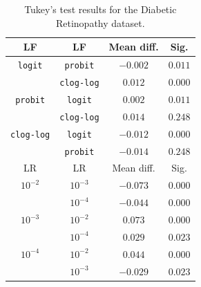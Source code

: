 \documentclass[journal]{IEEEtran}
\begin{document}
	\begin{table}[!t]
		\caption{Tukey's test results for the Diabetic Retinopathy dataset.}
		\label{table:TukeyDR}
		\centering
		\begin{tabular}{cccc}
			\hline\hline
			       LF         &        LF         & Mean diff. &  Sig.   \\ \hline
			 \texttt{logit}   &  \texttt{probit}  &  $-0.002$  & $0.011$ \\
			                  & \texttt{clog-log} &  $0.012$   & $0.000$ \\
			 \texttt{probit}  &  \texttt{logit}   &  $0.002$   & $0.011$ \\
			                  & \texttt{clog-log} &  $0.014$   & $0.248$ \\
			\texttt{clog-log} &  \texttt{logit}   &  $-0.012$  & $0.000$ \\
			                  &  \texttt{probit}  &  $-0.014$  & $0.248$ \\ \hline\hline
			       LR         &        LR         & Mean diff. &  Sig.   \\ \hline
			    $10^{-2}$     &     $10^{-3}$     &  $-0.073$  & $0.000$ \\
			                  &     $10^{-4}$     &  $-0.044$  & $0.000$ \\
			    $10^{-3}$     &     $10^{-2}$     &  $0.073$   & $0.000$ \\
			                  &     $10^{-4}$     &  $0.029$   & $0.023$ \\
			    $10^{-4}$     &     $10^{-2}$     &  $0.044$   & $0.000$ \\
			                  &     $10^{-3}$     &  $-0.029$  & $0.023$ \\ \hline\hline
		\end{tabular}
	\end{table}
	
\end{document}
